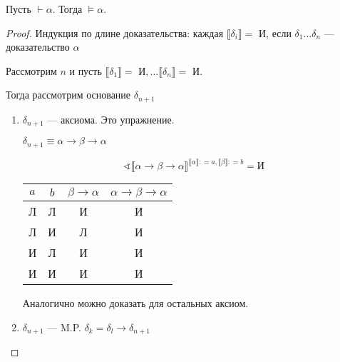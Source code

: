 \begin{theorem}
    Пусть \(\vdash \alpha\). Тогда \(\models \alpha\).
\end{theorem}
\begin{proof}
    Индукция по длине доказательства: каждая \(\llbracket \delta_i \rrbracket = \text{ И}\), если \(\delta_1 \dots \delta_n\) --- доказательство \(\alpha\)

    Рассмотрим \(n\) и пусть \(\llbracket \delta_1 \rrbracket = \text{ И}, \dots \llbracket \delta_n \rrbracket = \text{ И}\).

    Тогда рассмотрим основание \(\delta_{n + 1}\)
    \begin{enumerate}
        \item \(\delta_{n + 1}\) --- аксиома. Это упражнение.

              \begin{example}
                  \(\delta_{n + 1} \equiv \alpha \to \beta \to \alpha\)

                  \[\sphericalangle \llbracket \alpha \to \beta \to \alpha \rrbracket^{\llbracket \alpha \rrbracket : = a, \llbracket \beta \rrbracket : = b} = \text{И}\]

                  \begin{center}
                      \begin{tabular}{c|c|c|c}
                          \(a\) & \(b\) & \(\beta \to \alpha\) & \(\alpha \to \beta \to \alpha\) \\ \hline
                          Л     & Л     & И                    & И                               \\
                          Л     & И     & Л                    & И                               \\
                          И     & Л     & И                    & И                               \\
                          И     & И     & И                    & И                               \\
                      \end{tabular}
                  \end{center}
              \end{example}

              Аналогично можно доказать для остальных аксиом.

        \item \(\delta_{n + 1}\) --- M.P. \(\delta_k = \delta_l \to \delta_{n + 1}\)


\end{enumerate}
\end{proof}

